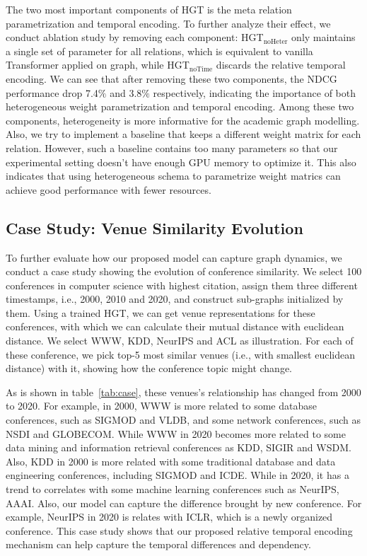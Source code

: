 \documentclass[sigconf]{acmart}
\theoremstyle{definition}
\begin{document}
{The two most important components of HGT is the meta relation parametrization and temporal encoding. To further analyze their effect, we conduct ablation study by removing each component: HGT$_{\text{noHeter}}$ only maintains a single set of parameter for all relations, which is equivalent to vanilla Transformer applied on graph, while HGT$_{\text{noTime}}$ discards the relative temporal encoding. We can see that after removing these two components, the NDCG performance drop 7.4$\%$ and 3.8$\%$ respectively, indicating the importance of both heterogeneous weight parametrization and temporal encoding. Among these two components, heterogeneity is more informative for the academic graph modelling. Also, we try to implement a baseline that keeps a different weight matrix for each relation. However, such a baseline contains too many parameters so that our experimental setting doesn't have enough GPU memory to optimize it. This also indicates that using heterogeneous schema to parametrize weight matrics can achieve good performance with fewer resources.

\subsection{Case Study: Venue Similarity Evolution}

To further evaluate how our proposed model can capture graph dynamics, we conduct a case study showing the evolution of conference similarity. We select 100 conferences in computer science with highest citation, assign them three different timestamps, i.e., 2000, 2010 and 2020, and construct sub-graphs initialized by them. Using a trained HGT, we can get venue representations for these conferences, with which we can calculate their mutual distance with euclidean distance. We select WWW, KDD, NeurIPS and ACL as illustration. For each of these conference, we pick top-5 most similar venues (i.e., with smallest euclidean distance) with it, showing how the conference topic might change. 

As is shown in table~\ref{tab:case}, these venues's relationship has changed from 2000 to 2020. For example, in 2000, WWW is more related to some database conferences, such as SIGMOD and VLDB, and some network conferences, such as NSDI and GLOBECOM. While WWW in 2020 becomes more related to some data mining and information retrieval conferences as KDD, SIGIR and WSDM. Also, KDD in 2000 is 
more related with some traditional database and data engineering conferences, including SIGMOD and ICDE. While in 2020, it has a trend to correlates with some machine learning conferences such as NeurIPS, AAAI. Also, our model can capture the difference brought by new conference. For example, NeurIPS in 2020 is relates with ICLR, which is a newly organized conference. This case study shows that our proposed relative temporal encoding mechanism can help capture the temporal differences and dependency.

}
\end{document}
